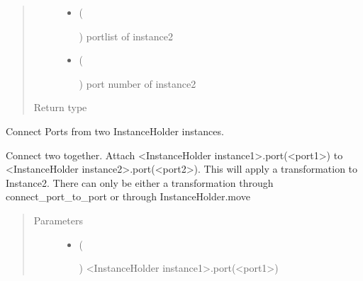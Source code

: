 \documentclass[a4paper,10pt,english]{sphinxmanual}
\begin{document}
\begin{fulllineitems}
\begin{fulllineitems}
\begin{quote}
\begin{description}
\begin{itemize}
\item {} 
 (%
\begin{footnote}[42]\sphinxAtStartFootnote
{}
%
\end{footnote}) \textendash{} portlist of instance2

\item {} 
 (%
\begin{footnote}[43]\sphinxAtStartFootnote
{}
%
\end{footnote}) \textendash{} port number of instance2

\end{itemize}

\item[{Return type}] \leavevmode
{}

\end{description}\end{quote}

\end{fulllineitems}


\begin{fulllineitems}
\label{\detokenize{photonics:photonics.PhotDevice.connect_port_to_port}}
Connect Ports from two InstanceHolder instances.

Connect two  together. Attach \textless{}InstanceHolder instance1\textgreater{}.port(\textless{}port1\textgreater{}) to \textless{}InstanceHolder instance2\textgreater{}.port(\textless{}port2\textgreater{}).
This will apply a transformation to Instance2. There can only be either a transformation through connect\_port\_to\_port or through InstanceHolder.move
\begin{quote}\begin{description}
\item[{Parameters}] \leavevmode\begin{itemize}
\item {} 
 (%
\begin{footnote}[44]\sphinxAtStartFootnote
{}
%
\end{footnote}) \textendash{} \textless{}InstanceHolder instance1\textgreater{}.port(\textless{}port1\textgreater{})


\end{itemize}
\end{description}
\end{quote}
\end{fulllineitems}
\end{fulllineitems}
\end{document}
